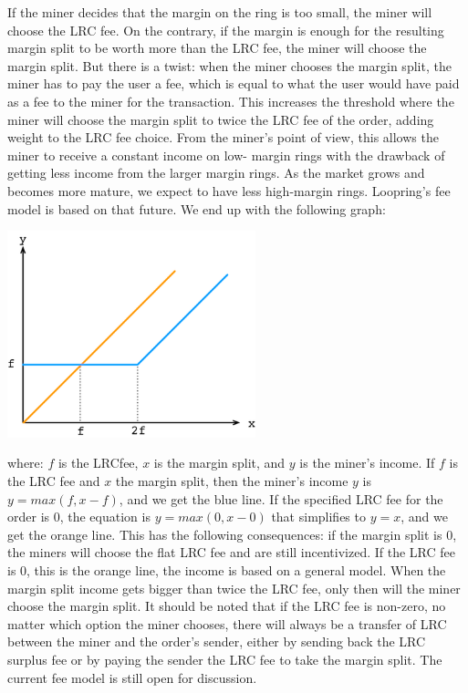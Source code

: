 \documentclass[UTF8,nofonts]{article}
\makeatletter
\newenvironment{figurehere}
 {\def\@captype{figure}}
 {}
\makeatother
\begin{document}
If the miner decides that the margin on the ring is too small, the miner will choose the LRC fee. On the contrary, if the margin is enough for the resulting margin split to be worth more than the LRC fee, the miner will choose the margin split.
But there is a twist: when the miner chooses the margin split, the miner has to pay the user a fee, which is equal to what the user would have paid as a fee to the miner for the transaction. This increases the threshold where the miner will choose the margin split to twice the LRC fee of the order, adding weight to the LRC fee choice.
From the miner's point of view, this allows the miner to receive a constant income on low- margin rings with the drawback of getting less income from the larger margin rings. As the market grows and becomes more mature, we expect to have less high-margin rings. Loopring’s fee model is based on that future.
We end up with the following graph:
\begin{center}
\begin{figurehere}
\includegraphics[height=6cm]{images/fee-model.png}
\label{fig: Loopringrotocol}
\end{figurehere}
\end{center}

where: $f$ is the LRCfee, $x$ is the margin split, and $y$ is the miner's income.
If $f$ is the LRC fee and $x$ the margin split, then the miner's income $y$ is $y = max(f, x-f)$, and we get the blue line.
If the specified LRC fee for the order is 0, the equation is $y = max(0, x - 0)$ that simplifies to $y = x$, and we get the orange line.
This has the following consequences: if the margin split is 0, the miners will choose the flat LRC fee and are still incentivized. If the LRC fee is 0, this is the orange line, the income is based on a general model. When the margin split income gets bigger than twice the LRC fee, only then will the miner choose the margin split.
It should be noted that if the LRC fee is non-zero, no matter which option the miner chooses, there will always be a transfer of LRC between the miner and the order's sender, either by sending back the LRC surplus fee or by paying the sender the LRC fee to take the margin split.
The current fee model is still open for discussion.
\end{document}
